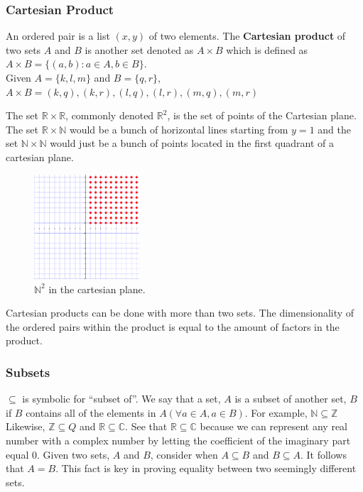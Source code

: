\documentclass[12pt]{report}
\begin{document}
\subsubsection{Cartesian Product}

\hspace{\parindent}An ordered pair is a list $(x, y)$ of two elements. The \textbf{Cartesian product} of two sets $A$ and $B$ is another set denoted as $A \times B$ which is defined as $A \times B = \{(a, b):a\in A, b\in B\}$.\\
Given $A=\{k,l,m\}$ and $B=\{q,r\}$, $A \times B = {(k,q),(k,r),(l,q),(l, r),(m, q),(m,r)}$\vspace{5pt}

The set $\mathbb R \times \mathbb R$, commonly denoted $\mathbb{R}^2$, is the set of points of the Cartesian plane. The set $\mathbb R \times \mathbb N$ would be a bunch of horizontal lines starting from $y=1$ and the set $\mathbb N \times \mathbb N$ would just be a bunch of points located in the first quadrant of a cartesian plane.
\begin{figure}[h]
    \centering
    \includegraphics[width=0.35\textwidth]{nxn.pdf}
    \caption{$\mathbb{N}^2$ in the cartesian plane.}
\end{figure}

Cartesian products can be done with more than two sets. The dimensionality of the ordered pairs within the product is equal to the amount of factors in the product.

\subsubsection{Subsets}

\hspace{\parindent}$\subseteq$ is symbolic for ``subset of''. We say that a set, $A$ is a subset of another set, $B$ if $B$ contains all of the elements in $A$\hspace{5pt}$(\forall a \in A, a \in B)$. For example, $\mathbb{N} \subseteq \mathbb{Z}$ Likewise, $\mathbb{Z} \subseteq {Q}$ and $\mathbb{R} \subseteq \mathbb{C}$. See that $\mathbb{R} \subseteq \mathbb{C}$ because we can represent any real number with a complex number by letting the coefficient of the imaginary part equal $0$. Given two sets, $A$ and $B$, consider when $A \subseteq B$ and $B \subseteq A$. It follows that $A=B$. This fact is key in proving equality between two seemingly different sets.
\end{document}
